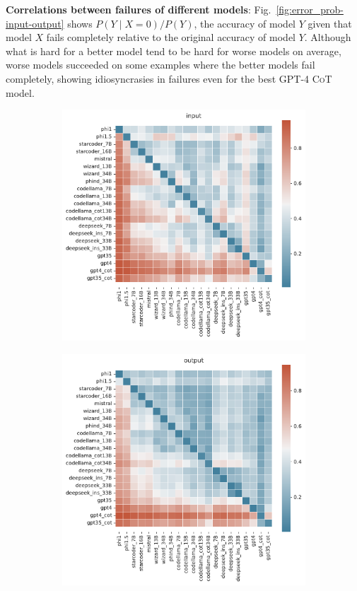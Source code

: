 \textbf{Correlations between failures of different models}: Fig.~\ref{fig:error_prob-input-output} shows $P(Y \mid X=0) / P(Y)$, the accuracy of model $Y$ given that model $X$ fails completely relative to the original accuracy of model $Y$. Although what is hard for a better model tend to be hard for worse models on average, worse models succeeded on some examples where the better models fail completely, showing idiosyncrasies in failures even for the best \textsc{GPT-4 CoT} model.
\begin{figure}[H]
     \centering
     \begin{subfigure}[b]{0.49\textwidth}
         \centering
         \includegraphics[width=1\textwidth]{figs/error_prob_input_heatmap.pdf}
     \end{subfigure}
     \hfill
     \begin{subfigure}[b]{0.49\textwidth}
         \centering
         \includegraphics[width=1\textwidth]{figs/error_prob_output_heatmap.pdf}

\end{subfigure}
\end{figure}
